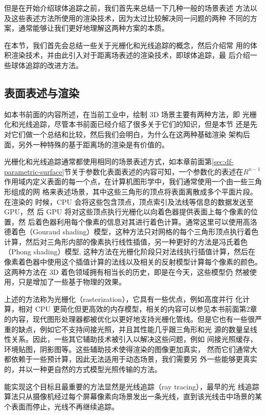 但是在开始介绍球体追踪之前，我们首先来总结一下几种一般的场景表述 方法以及这些表述方法所使用的渲染技术，因为太过比较解决同一问题的两种 不同的方案，通常能够让我们更好地理解这两种方案的本质。

在本节，我们首先会总结一些关于光栅化和光线追踪的概念，然后介绍常 用的体积渲染技术，并由此引入对于距离场表述的渲染技术，即球体追踪，最 后介绍一些球体追踪的改进方法。




\subsection{表面表述与渲染}
如本书前面的内容所述，在当前工业中，绘制 3D 场景主要有两种方法，即 光栅化和光线追踪，尽管本书前面已经介绍了很多关于它们的知识，但是本节 还是先对它们做一个总结和比较，然后我们会明白，为什么在这两种基础渲染 架构后面，另外一种特殊的基于距离场的渲染是有价值的。

光栅化和光线追踪通常都使用相同的场景表述方式，如本章前面第\ref{sec:df-parametric-surface}节关于参数化表面表述的内容可知，一个参数化的表述在$R^{n−1}$作用域内定义表面的每一个点，在计算机图形学中，我们通常使用一个由一些三角形组成的网 格来表述场景，其中这些三角形的顶点将表面离散成多个平面片段。在渲染的 时候，CPU 会将这些包含顶点，顶点索引及法线等信息的数据发送至 GPU，然 后 GPU 将对这些顶点执行光栅化以向着色器提供表面上每个像素的位置，然 后着色器利用每个像素的信息对其进行着色计算。通常这里可以使用高洛德着色（Gouraud shading）模型，这种方法只对网格的每个三角形顶点执行着色计算，然后对三角形内部的像素执行线性插值，另一种更好的方法是冯氏着色（Phong shading）模型, 这种方法在光栅化阶段只对法线执行插值计算，然后在像素着色器中使用这个插值计算的法线以及相关的反射模型计算每个像素的颜色。这两种方法在 3D 着色领域拥有相当长的历史，即是在今天，这些模型仍 然被使用，只是增加了一些基于物理的效果。

上述的方法称为光栅化（rasterization），它具有一些优点，例如高度并行 化计算，相对 CPU 更简化但更高效的内存模型，相关的内容可以参见本书前面第2章的内容，现代图形处理器都被优化以更好地支持光栅化管线。但是它也有一些很严重的缺点，例如它不支持间接光照，并且其性能几乎跟三角形和光 源的数量呈线性关系。因此，一些其它辅助技术被引入以解决这些问题，例如 间接光照缓存，环境贴图，阴影图等。这些辅助技术使得渲染的图像更加真实， 然而它们通常大都依赖于一些预计算，因此无法适用于动态场景，我们需要另 外一些能够更真实的，并以一种更自然的方式模型光照传输的方法。

能实现这个目标且最重要的方法显然是光线追踪（ray tracing），最早的光 线追踪算法只从摄像机经过每个屏幕像素向场景发出一条光线，直到该光线击中场景的某个表面而停止，光线不再继续追踪。

